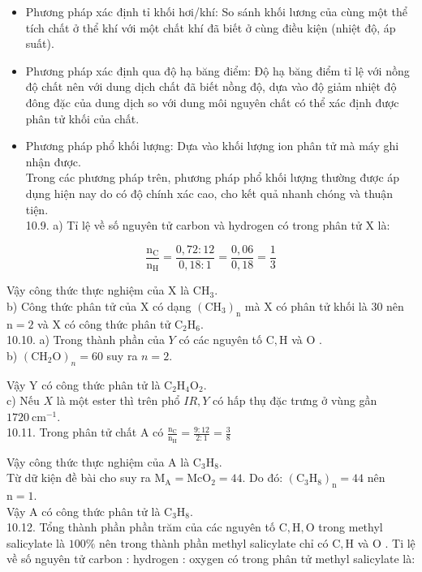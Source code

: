 \documentclass[10pt]{article}
\begin{document}
\begin{itemize}
  \item Phương pháp xác định tỉ khối hơi/khí: So sánh khối lương của cùng một thể tích chất ở thể khí với một chất khí đã biết ở cùng điều kiện (nhiệt độ, áp suất).
  \item Phương pháp xác định qua độ hạ băng điểm: Độ hạ băng điểm tỉ lệ với nồng độ chất nên với dung dịch chất đã biết nồng độ, dựa vào độ giảm nhiệt độ đông đặc của dung dịch so với dung môi nguyên chất có thể xác định được phân tử khối của chất.
  \item Phương pháp phổ khối lượng: Dựa vào khối lượng ion phân tử mà máy ghi nhận được.\\
Trong các phương pháp trên, phương pháp phổ khối lượng thường được áp dụng hiện nay do có độ chính xác cao, cho kết quả nhanh chóng và thuận tiện.\\
10.9. a) Tỉ lệ về số nguyên tử carbon và hydrogen có trong phân tử X là:
\end{itemize}

$$
\frac{\mathrm{n}_{\mathrm{C}}}{\mathrm{n}_{\mathrm{H}}}=\frac{0,72: 12}{0,18: 1}=\frac{0,06}{0,18}=\frac{1}{3}
$$

Vậy công thức thực nghiệm của X là $\mathrm{CH}_{3}$.\\
b) Công thức phân tử của X có dạng $\left(\mathrm{CH}_{3}\right)_{\mathrm{n}}$ mà X có phân tử khối là 30 nên $\mathrm{n}=2$ và X có công thức phân tử $\mathrm{C}_{2} \mathrm{H}_{6}$.\\
10.10. a) Trong thành phần của $Y$ có các nguyên tố $\mathrm{C}, \mathrm{H}$ và O .\\
b) $\left(\mathrm{CH}_{2} \mathrm{O}\right)_{n}=60$ suy ra $n=2$.

Vậy Y có công thức phân tử là $\mathrm{C}_{2} \mathrm{H}_{4} \mathrm{O}_{2}$.\\
c) Nếu $X$ là một ester thì trên phổ $I R, Y$ có hấp thụ đặc trưng ở vùng gần $1720 \mathrm{~cm}^{-1}$.\\
10.11. Trong phân tử chất A có $\frac{\mathrm{n}_{\mathrm{C}}}{\mathrm{n}_{\mathrm{H}}}=\frac{9: 12}{2: 1}=\frac{3}{8}$

Vậy công thức thực nghiệm của A là $\mathrm{C}_{3} \mathrm{H}_{8}$.\\
Từ dữ kiện đề bài cho suy ra $\mathrm{M}_{\mathrm{A}}=\mathrm{McO}_{2}=44$. Do đó: $\left(\mathrm{C}_{3} \mathrm{H}_{8}\right)_{\mathrm{n}}=44$ nên $\mathrm{n}=1$.\\
Vậy A có công thức phân tử là $\mathrm{C}_{3} \mathrm{H}_{8}$.\\
10.12. Tổng thành phần phần trăm của các nguyên tố $\mathrm{C}, \mathrm{H}, \mathrm{O}$ trong methyl salicylate là $100 \%$ nên trong thành phần methyl salicylate chỉ có $\mathrm{C}, \mathrm{H}$ và O . Ti lệ về số nguyên tử carbon : hydrogen : oxygen có trong phân tử methyl salicylate là:
\end{document}
